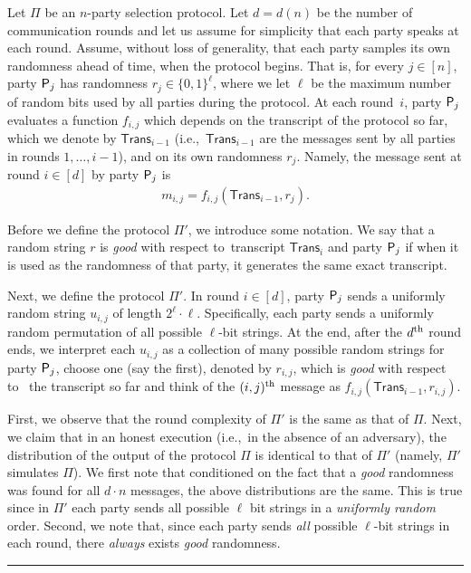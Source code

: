 \documentclass[11pt]{article}
\theoremstyle{plain}
\theoremstyle{definition}
\numberwithin{equation}{section}
\newcommand{\qedsymb}{\hfill{\rule{2mm}{2mm}}}
\newenvironment{proofsketch}{\begin{trivlist} \item[\hspace{\labelsep}{\bf
\noindent Proof Sketch.\/}] }{\qedsymb\end{trivlist}}
\numberwithin{equation}{section} \newcommand{\aka} {also known as\ }
\newcommand{\wrt} {with respect to\ }
\newcommand{\ie}  {i.e.,\ }
\newcommand{\B}{\{ 0,1 \}}
\newcommand{\1}{\mathbf{1}}
\newcommand{\ith}[1]{{#1}\textsuperscript{th}}
\newcommand{\trans}{{\mathsf{Trans}}}
\theoremstyle{remark}
\begin{document}
\begin{proofsketch}
  Let $\Pi$ be an $n$-party selection protocol. Let $d = d(n)$ be the number of
  communication rounds and let us assume for simplicity that each party speaks
  at each round. Assume, without loss of generality, that each party samples its
  own randomness ahead of time, when the protocol begins. That is, for every
  $j\in[n]$, party $\mathsf{P}_{{j}}$ has randomness $r_j\in\B^{\ell}$, where we let
  $\ell$ be the maximum number of random bits used by all parties during the
  protocol. At each round~$i$, party $\mathsf{P}_{{j}}$ evaluates a function $f_{i,j}$
  which depends on the transcript of the protocol so far, which we denote by
  $\trans_{i-1}$ (\ie $\trans_{i-1}$ are the messages sent by all parties in
  rounds $1,\dots,i-1$), and on its own randomness $r_j$. Namely, the message
  sent at round $i\in[d]$ by party $\mathsf{P}_{{j}}$ is
  \begin{align*}
    m_{i,j} = f_{i,j}(\trans_{i-1}, r_j).
  \end{align*}

  Before we define the protocol $\Pi'$, we introduce some notation. We say that
  a random string $r$ is \emph{good} \wrt transcript $\trans_i$ and party
  $\mathsf{P}_{{j}}$ if when it is used as the randomness of that party, it generates
  the same exact transcript.

  Next, we define the protocol $\Pi'$. In round $i\in[d]$, party $\mathsf{P}_{{j}}$
  sends a uniformly random string $u_{i,j}$ of length $2^{\ell}\cdot \ell$. Specifically, each
  party sends a uniformly random permutation of all possible $\ell$-bit
  strings. At the end, after the $\ith{d}$ round ends, we interpret each
  $u_{i,j}$ as a collection of many possible random strings for party $\mathsf{P}_{{j}}$,
  choose one (say the first), denoted by $r_{i,j}$, which is \emph{good} \wrt
  the transcript so far and think of the $\ith{(i,j)}$ message as
  $f_{i,j}(\trans_{i-1}, r_{i,j})$.



  First, we observe that the round complexity of $\Pi'$ is the same as that of
  $\Pi$. Next, we claim that in an honest execution (\ie in the absence of an
  adversary), the distribution of the output of the protocol $\Pi$ is identical
  to that of $\Pi'$ (namely, $\Pi'$ simulates $\Pi$). We first note that
  conditioned on the fact that a \emph{good} randomness was found for all
  $d\cdot n$ messages, the above distributions are the same. This is true since
  in $\Pi'$ each party sends all possible $\ell$ bit strings in a {\em uniformly
    random} order. Second, we note that, since each party sends \emph{all}
  possible $\ell$-bit strings in each round, there \emph{always} exists
  \emph{good} randomness.


\end{proofsketch}
\end{document}
